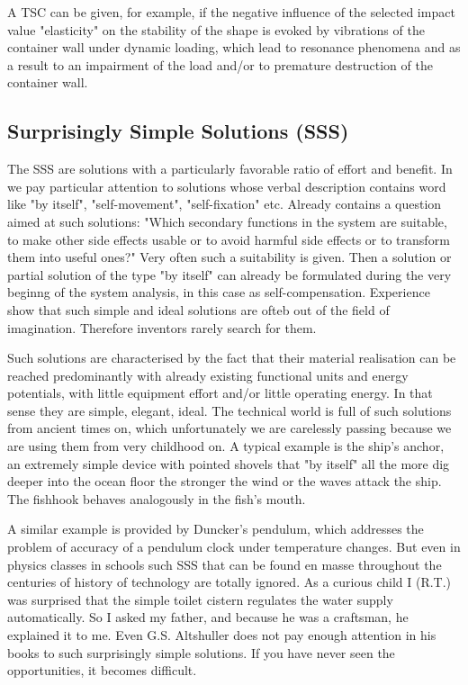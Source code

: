 \documentclass[11pt,a4paper]{article}
\begin{document}
A TSC can be given, for example, if the negative influence of the selected
impact value "elasticity" on the stability of the shape is evoked by
vibrations of the container wall under dynamic loading, which lead to
resonance phenomena and as a result to an impairment of the load and/or to
premature destruction of the container wall.

\subsection{Surprisingly Simple Solutions (SSS)}

The SSS are solutions with a particularly favorable ratio of effort and
benefit.  In \cite[(6.4),(9.3)]{RM-21} we pay particular attention to
solutions whose verbal description contains word like "by itself",
"self-movement", "self-fixation" etc.  Already \cite[(2.14)]{RM-21} contains a
question aimed at such solutions: "Which secondary functions in the system are
suitable, to make other side effects usable or to avoid harmful side effects
or to transform them into useful ones?" Very often such a suitability is
given. Then a solution or partial solution of the type "by itself" can already
be formulated during the very beginng of the system analysis, in this case as
self-compensation.  Experience show that such simple and ideal solutions are
ofteb out of the field of imagination.  Therefore inventors rarely search for
them.

Such solutions are characterised by the fact that their material realisation
can be reached predominantly with already existing functional units and energy
potentials, with little equipment effort and/or little operating energy. In
that sense they are simple, elegant, ideal. The technical world is full of
such solutions from ancient times on, which unfortunately we are carelessly
passing because we are using them from very childhood on. A typical example is
the ship's anchor, an extremely simple device with pointed shovels that "by
itself" all the more dig deeper into the ocean floor the stronger the wind or
the waves attack the ship.  The fishhook behaves analogously in the fish's
mouth.

A similar example is provided by Duncker's pendulum, which addresses the
problem of accuracy of a pendulum clock under temperature changes. But even in
physics classes in schools such SSS that can be found en masse throughout the
centuries of history of technology are totally ignored. As a curious child I
(R.T.) was surprised that the simple toilet cistern regulates the water
supply automatically.  So I asked my father, and because he was a craftsman,
he explained it to me. Even G.S. Altshuller does not pay enough attention in
his books to such surprisingly simple solutions. If you have never seen the
opportunities, it becomes difficult.
\end{document}

